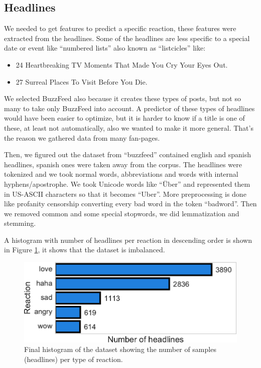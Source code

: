 \documentclass[9pt]{article}
\begin{document}
\subsection{Headlines}

We needed to get features to predict a specific reaction, these features were extracted from the headlines. Some of the headlines are less specific to a special date or event like ``numbered lists'' also known as ``listcicles'' like:
\begin{itemize}
 \item 24 Heartbreaking TV Moments That Made You Cry Your Eyes Out.
 \item 27 Surreal Places To Visit Before You Die.
\end{itemize}

We selected BuzzFeed also because it creates these types of posts, but not so many to take only BuzzFeed into account. A predictor of these types of headlines would have been easier to optimize, but it is harder to know if a title is one of these, at least not automatically, also we wanted to make it more general. That's the reason we gathered data from many fan-pages.

Then, we figured out the dataset from ``buzzfeed'' contained english and spanish headlines, spanish ones were taken away from the corpus. The headlines were tokenized and we took normal words, abbreviations and words with internal hyphens/apostrophe. We took Unicode words like ``Über'' and represented them in US-ASCII characters so that it becomes ``Uber''. More preprocessing is done like profanity censorship converting every bad word in the token ``badword''. Then we removed common and some special stopwords, we did lemmatization and stemming.

A histogram with number of headlines per reaction in descending order is shown in Figure \ref{fig:hist}, it shows that the dataset is imbalanced.

\begin{figure}[ht!]
\centering
\includegraphics[width=1.0\columnwidth]{../3_notebooks/notebook_figures/histogram_reactions.pdf}
\caption{Final histogram of the dataset showing the number of samples (headlines) per type of reaction.}
\label{fig:hist}
\end{figure}
\end{document}
